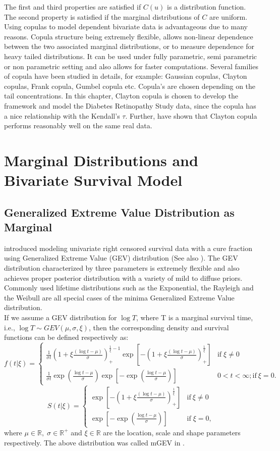 \documentclass[11pt]{article}
\theoremstyle{remboldstyle}
\begin{document}
The first and third properties are satisfied if $C(u)$ is a distribution function. The second property is satisfied if the marginal distributions of $C$ are uniform. Using copulas to model dependent bivariate data is advantageous due to many reasons. Copula structure being extremely flexible, allows non-linear dependence between the two associated marginal distributions, or to measure dependence for heavy tailed distributions. It can be used under fully parametric, semi parametric or non parametric setting and also allows for faster computations. Several families of copula have been studied in details, for example: Gaussian copulas, Clayton copulas, Frank copula, Gumbel copula etc. Copula's are chosen depending on the tail concentrations. In this chapter, Clayton copula is chosen to develop the framework and model the Diabetes Retinopathy Study data, since the copula has a nice relationship with the Kendall's $\tau$. Further, \cite{romeo:tanaka:2006} have shown that Clayton copula performs reasonably well on the same real data.
\section{Marginal Distributions and Bivariate Survival Model}
\label{sec:marg}
\subsection{Generalized Extreme Value Distribution as Marginal}
\noindent
\cite{roy:roy:dey:2013} introduced modeling univariate right censored survival data with a cure fraction using Generalized Extreme Value (GEV) distribution (See also \cite{roy:dey:2014}). The GEV distribution characterized by three parameters is extremely flexible and also achieves proper posterior distribution with a variety of mild to diffuse priors. Commonly used lifetime distributions such as the Exponential, the Rayleigh and the Weibull are all special cases of the minima Generalized Extreme Value distribution.\\
If we assume a GEV distribution for $\log T$, where T is a marginal survival time, i.e., $\log T \sim GEV (\mu,\sigma,\xi)$, then the corresponding density and survival functions can be defined respectively as:\\
\[
f(t|\xi)=\begin{cases}
\frac{1}{\sigma t}(1+\xi\frac{(\log t - \mu)}{\sigma})_{+}^{\frac{1}{\xi}-1}\exp[-(1+\xi\frac{(\log t - \mu)}{\sigma})_{+}^{\frac{1}{\xi}}] & \mbox{if} \; \xi  \neq 0\\
\frac{1}{\sigma t}\exp(\frac{\log t - \mu}{\sigma})\exp[-\exp(\frac{\log t - \mu}{\sigma})] & 0<t<\infty; \mbox{if}\ \xi=0.
\end{cases}
\]
\[
S(t|\xi)=\begin{cases}
\exp[-(1+\xi\frac{(\log t - \mu)}{\sigma})_{+}^{\frac{1}{\xi}}]  & \mbox{if}\ \xi\neq0\\
\exp[-\exp(\frac{\log t - \mu}{\sigma})] & \mbox{if} \; \xi=0,
\end{cases}
\]
where $\mu\in \mathbb{R},\; \sigma\in \mathbb{R}^+$ and $\xi\in \mathbb{R}$ are the location, scale and shape parameters respectively. The above distribution was called mGEV in \cite{roy:roy:dey:2013}.
\end{document}
